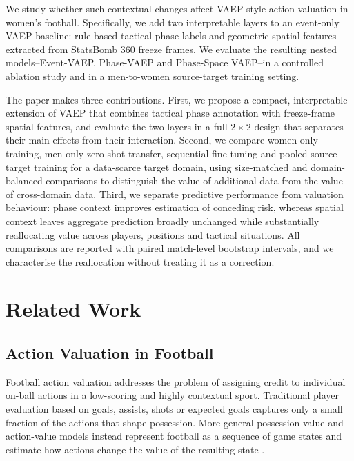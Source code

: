 \documentclass[runningheads]{llncs}
\begin{document}
We study whether such contextual changes affect VAEP-style action valuation in women's football. Specifically, we add two interpretable layers to an event-only VAEP baseline: rule-based tactical phase labels and geometric spatial features extracted from StatsBomb 360 freeze frames. We evaluate the resulting nested models--Event-VAEP, Phase-VAEP and Phase-Space VAEP--in a controlled ablation study and in a men-to-women source-target training setting.

The paper makes three contributions. First, we propose a compact, interpretable extension of VAEP that combines tactical phase annotation with freeze-frame spatial features, and evaluate the two layers in a full $2 \times 2$ design that separates their main effects from their interaction. Second, we compare women-only training, men-only zero-shot transfer, sequential fine-tuning and pooled source-target training for a data-scarce target domain, using size-matched and domain-balanced comparisons to distinguish the value of additional data from the value of cross-domain data. Third, we separate predictive performance from valuation behaviour: phase context improves estimation of conceding risk, whereas spatial context leaves aggregate prediction broadly unchanged while substantially reallocating value across players, positions and tactical situations. All comparisons are reported with paired match-level bootstrap intervals, and we characterise the reallocation without treating it as a correction.

\section{Related Work}

\subsection{Action Valuation in Football}

Football action valuation addresses the problem of assigning credit to individual on-ball actions in a low-scoring and highly contextual sport. Traditional player
evaluation based on goals, assists, shots or expected goals captures only a small fraction of the actions that shape possession. More general possession-value and
action-value models instead represent football as a sequence of game states and estimate how actions change the value of the resulting state \cite{decroos2019actions,liu2020deep}.
\end{document}

